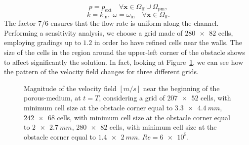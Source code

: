 \begin{equation}
	p = p_\text{ext} \quad \forall \mathbf{x} \in \Omega_\text{ff} \cup \Omega_\text{pm},
\end{equation}
\begin{equation}
	k = k_\text{in}, \; \omega = \omega_\text{in} \quad \forall \mathbf{x} \in \Omega_\text{ff}.
\end{equation}
The factor $7/6$ ensures that the flow rate is uniform along the channel.
Performing a sensitivity analysis, we choose a grid made of $\num{280x82}$ cells, employing gradings up to $1.2$ in order ho have refined cells near the walls. 
The size of the cells in the region around the upper-left corner of the obstacle shows to affect significantly the solution. In fact, looking at Figure~\ref{fig:obstacle_grid}, we can see how the pattern of the velocity field changes for three different grids.
\begin{figure}
	\centering
	\hspace{0.008\textwidth}
	\hspace{0.008\textwidth}
	\caption[short text]{Magnitude of the velocity field $[\si{m/s}]$ near the beginning of the porous-medium, at $t=T$, considering a grid of
	\protect{} $\num{207x52}$ cells, with minimum cell size at the obstacle corner equal to $\SI{3.3x4.4}{mm}$, 
	\protect{} $\num{242x68}$ cells, with minimum cell size at the obstacle corner equal to $\SI{2x2.7}{mm}$,
	\protect{} $\num{280x82}$ cells, with minimum cell size at the obstacle corner equal to $\SI{1.4x2}{mm}$.	
	$Re=\num{6e5}$.}
	\label{fig:obstacle_grid}
\end{figure}

